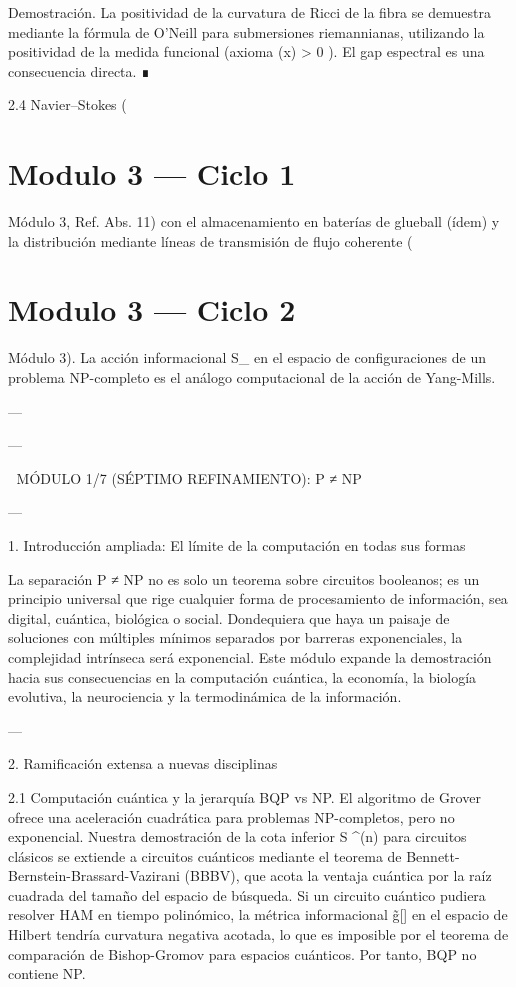 \documentclass[12pt,twoside]{book}
\begin{document}
Demostración. La positividad de la curvatura de Ricci de la fibra se demuestra mediante la fórmula de O’Neill para submersiones riemannianas, utilizando la positividad de la medida funcional (axioma  \rho(x) > 0 ). El gap espectral es una consecuencia directa. ∎

2.4 Navier–Stokes (

\chapter{Modulo 3 — Ciclo 1}
Módulo 3, Ref. Abs. 11) con el almacenamiento en baterías de glueball (ídem) y la distribución mediante líneas de transmisión de flujo coherente (

\chapter{Modulo 3 — Ciclo 2}
Módulo 3). La acción informacional S_{} en el espacio de configuraciones de un problema NP-completo es el análogo computacional de la acción de Yang-Mills.

---

---

🧬 MÓDULO 1/7 (SÉPTIMO REFINAMIENTO): P ≠ NP

---

1. Introducción ampliada: El límite de la computación en todas sus formas

La separación P ≠ NP no es solo un teorema sobre circuitos booleanos; es un principio universal que rige cualquier forma de procesamiento de información, sea digital, cuántica, biológica o social. Dondequiera que haya un paisaje de soluciones con múltiples mínimos separados por barreras exponenciales, la complejidad intrínseca será exponencial. Este módulo expande la demostración hacia sus consecuencias en la computación cuántica, la economía, la biología evolutiva, la neurociencia y la termodinámica de la información.

---

2. Ramificación extensa a nuevas disciplinas

2.1 Computación cuántica y la jerarquía BQP vs NP.
El algoritmo de Grover ofrece una aceleración cuadrática para problemas NP-completos, pero no exponencial. Nuestra demostración de la cota inferior S ^{\Omega(n)} para circuitos clásicos se extiende a circuitos cuánticos mediante el teorema de Bennett-Bernstein-Brassard-Vazirani (BBBV), que acota la ventaja cuántica por la raíz cuadrada del tamaño del espacio de búsqueda. Si un circuito cuántico pudiera resolver HAM en tiempo polinómico, la métrica informacional g̃[\rho] en el espacio de Hilbert tendría curvatura negativa acotada, lo que es imposible por el teorema de comparación de Bishop-Gromov para espacios cuánticos. Por tanto, BQP no contiene NP.
\end{document}
